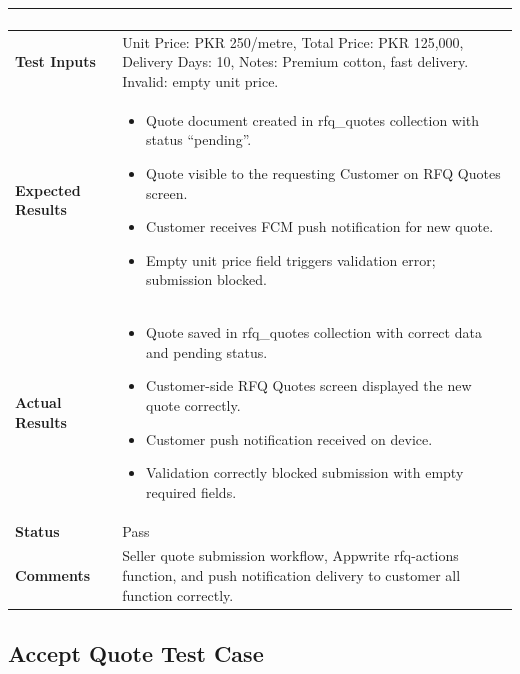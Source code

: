 \begin{table}[H]
\begin{tabular}{|p{3.2cm}|p{10.8cm}|}
\begin{enumerate}[leftmargin=*,noitemsep]
\end{enumerate} \\ \hline
\textbf{Test Inputs} & Unit Price: PKR 250/metre, Total Price: PKR 125,000, Delivery Days: 10, Notes: Premium cotton, fast delivery. \newline Invalid: empty unit price. \\ \hline
\textbf{Expected Results} &
\begin{itemize}[leftmargin=*,noitemsep]
\item Quote document created in rfq\_quotes collection with status ``pending''.
\item Quote visible to the requesting Customer on RFQ Quotes screen.
\item Customer receives FCM push notification for new quote.
\item Empty unit price field triggers validation error; submission blocked.
\end{itemize} \\ \hline
\textbf{Actual Results} &
\begin{itemize}[leftmargin=*,noitemsep]
\item Quote saved in rfq\_quotes collection with correct data and pending status.
\item Customer-side RFQ Quotes screen displayed the new quote correctly.
\item Customer push notification received on device.
\item Validation correctly blocked submission with empty required fields.
\end{itemize} \\ \hline
\textbf{Status} & Pass \\ \hline
\textbf{Comments} & Seller quote submission workflow, Appwrite rfq-actions function, and push notification delivery to customer all function correctly. \\ \hline
\end{tabular}
\end{table}

\newpage
\subsection{Accept Quote Test Case}

